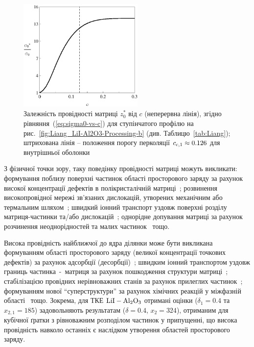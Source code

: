 \documentclass[14pt,twoside]{vakthesis}
\begin{document}
\begin{figure}[tb]
	\centering
	\includegraphics[width=0.55\textwidth]{Fig14_Liang_LiI-Al2O3-Matrix_2.eps}
	\caption{\label{fig:Liang_LiI-Al2O3-Matrix} Залежність провідності матриці ${z}^{*}_0$ від $c$ (неперервна лінія), згідно рівняння~(\ref{eq:sigma0-vs-c}) для ступінчатого профілю на рис.~\ref{fig:Liang_LiI-Al2O3-Processing-b} (див. Таблицю~\ref{tab:Liang}); штрихована лінія -- положення порогу перколяції $c_{{\rm c},1} \approx 0.126$ для внутрішньої оболонки}
\end{figure}
З фізичної точки зору, таку поведінку провідності матриці можуть викликати: формування поблизу поверхні частинок області просторового заряду за рахунок високої концентрації дефектів в полікристалічній матриці~\cite{Maier1986}; розвинення високопровідної мережі зв'язаних дислокацій, утворених механічним або термальним шляхом~\cite{Dudney1987, Dudney1988, Muhlherr1988}; швидкий іонний транспорт уздовж поверхні розділу матриця-частинки та/або дислокацій~\cite{Phipps1981, Atkinson1988}; однорідне допування матриці за рахунок розчинення неоднорідностей та малих частинок~\cite{Wen1983, Dupree1983, Dudney1985} тощо.

Висока провідність найближчої до ядра ділянки може бути викликана формуванням  області просторового заряду (великої концентрації точкових дефектів) за рахунок адсорбції (десорбції)~\cite{Jow1979}; швидким іонний транспортом уздовж границь частинка~-~матриця за рахунок пошкодження структури матриці~\cite{Phipps1981,Phipps1983}; стабілізацією провідних нерівноважних станів за рахунок прилеглих частинок~\cite{Ploch1988,Wiec1989}; формуванням нової ``суперструктури'' за рахунок хімічних реакцій у міжфазній області~\cite{Schmidt1988} тощо. Зокрема, для ТКЕ $\rm LiI-Al_2O_3$ отримані оцінки ($\delta_1 = 0.4$ та $x_{2,1} = 185$) задовольняють результатам \cite{Jiang1995a,Jiang1995b} ($\delta=0.4$, $x_2 = 324$), отриманим для кубічної ґратки з рівноважним розподілом частинок у припущенні, що висока провідність навколо останніх є наслідком утворення областей просторового заряду.
\end{document}
